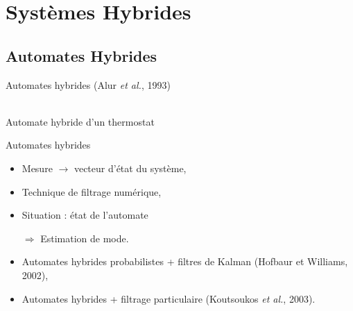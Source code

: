 \documentclass[compress]{beamer}
\begin{document}
\section{Systèmes Hybrides}

\subsection{Automates Hybrides}
\begin{frame}{Automates hybrides (Alur {\it et al.}, 1993)}
\begin{center}
\\
\small Automate hybride d'un thermostat
\end{center}
\end{frame}

\begin{frame}{Automates hybrides}
\begin{itemize}
\item Mesure  $\rightarrow$ vecteur d'état du système,
\item Technique de filtrage numérique,
\item Situation : état de l'automate
\item[$\Longrightarrow$] Estimation de mode.
\end{itemize}
\begin{itemize}
\item Automates hybrides probabilistes + filtres de Kalman (Hofbaur et Williams, 2002),
\item Automates hybrides + filtrage particulaire (Koutsoukos {\it et al.}, 2003).
\end{itemize}
\end{frame}
\end{document}
